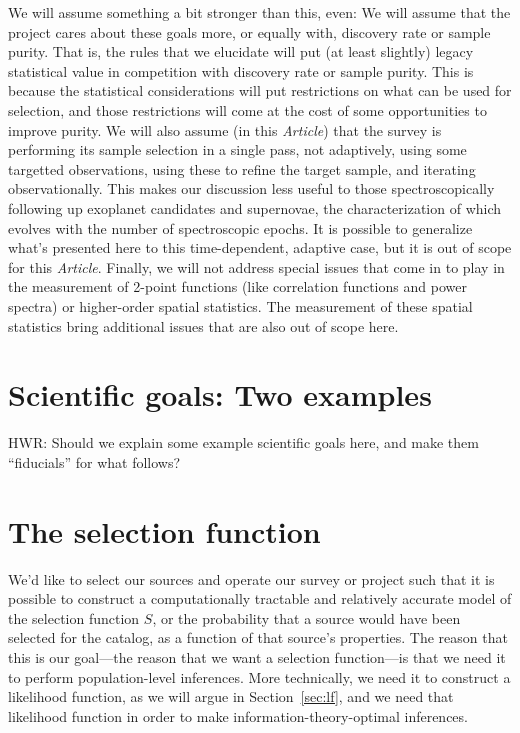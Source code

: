 \documentclass[modern]{aastex62}
\newcommand{\documentname}{\textsl{Article}}
\newcommand{\sectionname}{Section}
\begin{document}
We will assume something a bit stronger than this, even:
We will assume that the project cares about these goals more,
or equally with, discovery rate or sample purity.
That is, the rules that we elucidate will put (at least slightly)
legacy statistical value in competition with discovery rate or sample
purity.
This is because the statistical considerations will put restrictions
on what can be used for selection, and those restrictions will come at
the cost of some opportunities to improve purity.
We will also assume (in this \documentname) that the survey is performing
its sample selection in a single pass, not adaptively, using some
targetted observations, using these to refine the target sample, and
iterating observationally.
This makes our discussion less useful to those spectroscopically following up exoplanet
candidates and supernovae, the characterization of which evolves with
the number of spectroscopic epochs.
It is possible to generalize what's presented here to this time-dependent, adaptive
case, but it is out of scope for this \documentname.
Finally, we will not address special issues that come in to play in the
measurement of 2-point functions (like correlation functions and power
spectra) or higher-order spatial statistics.
The measurement of these spatial statistics bring additional issues
that are also out of scope here.

\section{Scientific goals: Two examples}

HWR: Should we explain some example scientific goals here, and make
them ``fiducials'' for what follows?

\section{The selection function}\label{sec:sf}

We'd like to select our sources and operate our survey or project such
that it is possible to construct a computationally tractable and
relatively accurate model of the selection function $S$, or the
probability that a source would have been selected for the catalog, as
a function of that source's properties.
The reason that this is our goal---the reason that we want a selection
function---is that we need it to perform population-level inferences.
More technically, we need it to construct a likelihood function, as we
will argue in \sectionname~\ref{sec:lf}, and we need that likelihood
function in order to make information-theory-optimal inferences.
\end{document}
